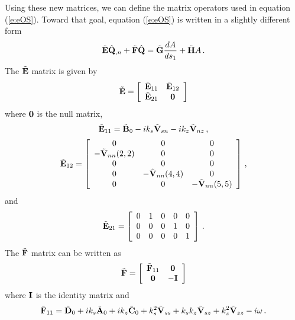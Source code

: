 Using these new matrices, we can define the matrix operators used in equation
(\ref{e:eOS}).  Toward that goal, equation (\ref{e:eOS}) is written in a
slightly different form
%
\begin{equation} \label{e:heOS}
  \tilde{{\bf E}} {\hat{\bf Q}}_{,n} + \tilde{{\bf F}} {\hat{\bf Q}} = \tilde{{\bf G}} \frac{dA}{ds_1} + 
  \tilde{{\bf H}} A {\, .}
\end{equation}
%
The $\tilde{{\bf E}}$ matrix is given by
%
\begin{equation}
 \tilde{{\bf E}} = \left[ \begin{array}{cc} \tilde{{\bf E}}_{11} & \tilde{{\bf E}}_{12} \\ 
                                    \tilde{{\bf E}}_{21} & {\bf 0} 
                  \end{array} 
           \right]
\end{equation}
%
where ${\bf 0}$ is the null matrix, 
%
\begin{equation}
  \tilde{{\bf E}}_{11} = \tilde{{\bf B}}_0 - i k_s {\tilde {\bf V}}_{sn} - i k_z 
                   {\tilde {\bf V}}_{nz} {\, ,}
\end{equation}
%
\begin{equation}
  \tilde{{\bf E}}_{12} = \left[ \begin{array}{ccc} 0 & 0 & 0 \\
                                        -{\tilde {\bf V}}_{nn}(2,2) & 0 & 0 \\
                                        0 & 0 & 0 \\
                                        0 & -{\tilde {\bf V}}_{nn}(4,4) & 0 \\
                                        0 & 0 & -{\tilde {\bf V}}_{nn}(5,5)
                        \end{array}
                 \right] {\, ,}
\end{equation}
%
and
%
\begin{equation}
  \tilde{{\bf E}}_{21} = \left[ \begin{array}{ccccc} 0 & 1 & 0 & 0 & 0 \\
                                             0 & 0 & 0 & 1 & 0 \\
                                             0 & 0 & 0 & 0 & 1 
                        \end{array}
                 \right] {\, .}
\end{equation}
%
The $\tilde{{\bf F}}$ matrix can be written as
%
\begin{equation}
 \tilde{{\bf F}} = \left[ \begin{array}{cc} \tilde{{\bf F}}_{11} & {\bf 0} \\ 
                                 {\bf 0} & -{\bf I} 
                  \end{array} 
           \right]
\end{equation}
%
where ${\bf I}$ is the identity matrix and
%
\begin{equation}
  \tilde{{\bf F}}_{11} = \tilde{{\bf D}}_0 + i k_s \tilde{{\bf A}}_0 + i k_z \tilde{{\bf C}}_0 + 
       k_s^2{\tilde {\bf V}}_{ss} + k_s k_z {\tilde {\bf V}}_{sz} + 
       k_z^2 {\tilde {\bf V}}_{zz} - i\omega {\, .}
\end{equation}

